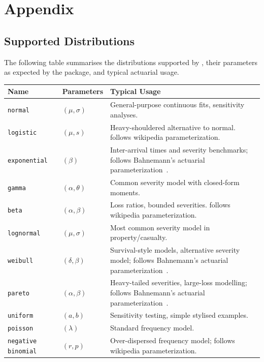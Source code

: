 \chapter{Appendix}
\label{chap:appendix}

\section{Supported Distributions}
\label{app:supported_distributions}

The following table summarises the distributions supported by
\actsim, their parameters as expected by the package, and typical
actuarial usage.

\begin{longtable}{p{}p{}p{}}
\toprule
\textbf{Name} & \textbf{Parameters} & \textbf{Typical Usage} \\
\midrule
\endhead
\texttt{normal}            & $(\mu, \sigma)$       & General-purpose continuous fits, sensitivity analyses. \\
\texttt{logistic}          & $(\mu, s)$ & Heavy-shouldered alternative to normal. follows wikipedia parameterization. \\
\texttt{exponential} & $(\beta)$ & Inter-arrival times and severity benchmarks; follows Bahnemann's actuarial parameterization~\citep{bahnemann2015distributions}. \\
\texttt{gamma}             & $(\alpha, \theta)$ & Common severity model with closed-form moments. \\
\texttt{beta}              & $(\alpha, \beta)$     & Loss ratios, bounded severities. follows wikipedia parameterization. \\
\texttt{lognormal}         & $(\mu, \sigma)$       & Most common severity model in property/casualty. \\
\texttt{weibull}           & $(\delta, \beta)$ & Survival-style models, alternative severity model; follows Bahnemann's actuarial parameterization~\citep{bahnemann2015distributions}. \\
\texttt{pareto}            & $(\alpha, \beta)$ & Heavy-tailed severities, large-loss modelling; follows Bahnemann's actuarial parameterization~\citep{bahnemann2015distributions}. \\
\texttt{uniform}           & $(a, b)$ & Sensitivity testing, simple stylised examples. \\
\texttt{poisson}           & $(\lambda)$           & Standard frequency model. \\
\texttt{negative binomial} & $(r, p)$              & Over-dispersed frequency model; follows wikipedia parameterization. \\
\bottomrule
\end{longtable}

